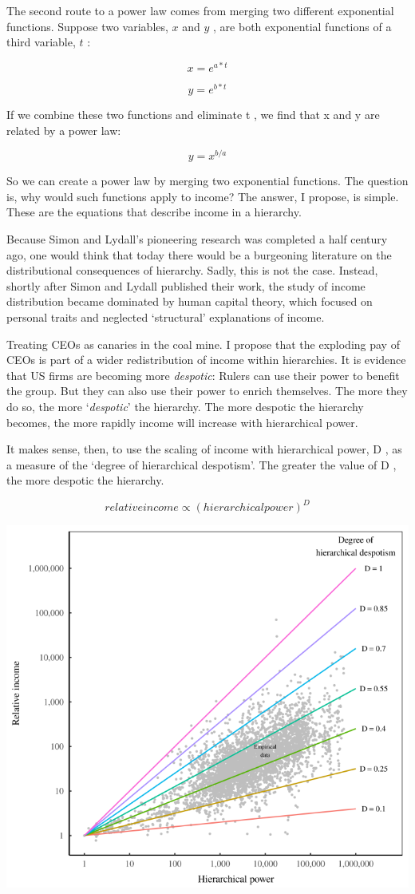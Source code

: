 \documentclass[
]{book}
\begin{document}
The second route to a power law comes from merging two different exponential functions. Suppose two variables, \(x\) and \(y\) , are both exponential functions of a third variable, \(t\) :

\[x = e^{a*t}\]

\[y = e^{b*t}\]

If we combine these two functions and eliminate t , we find that x and y are related by a power law:

\[y = x ^{b/a}\]

So we can create a power law by merging two exponential functions.
The question is, why would such functions apply to income?
The answer, I propose, is simple.
These are the equations that describe income in a hierarchy.

Because Simon and Lydall's pioneering research was completed a half century ago, one would think that today there would be a burgeoning literature on the distributional consequences of hierarchy. Sadly, this is not the case. Instead, shortly after Simon and Lydall published their work, the study of income distribution became dominated by human capital theory, which focused on personal traits and neglected `structural' explanations of income.

Treating CEOs as canaries in the coal mine. I propose that the exploding pay of CEOs is part of a wider redistribution of income within hierarchies. It is evidence that US firms are becoming more \emph{despotic}:
Rulers can use their power to benefit the group. But they can also use their power to enrich themselves. The more they do so, the more `\emph{despotic}' the hierarchy.
The more despotic the hierarchy becomes, the more rapidly income will increase with hierarchical power.

It makes sense, then, to use the scaling of income with hierarchical power, D , as a measure of the `degree of hierarchical despotism'. The greater the value of D , the more despotic the hierarchy.

\[relative income \propto (hierarchical power)^D\]

\includegraphics{fig/despotism_diagram.png}
\end{document}
